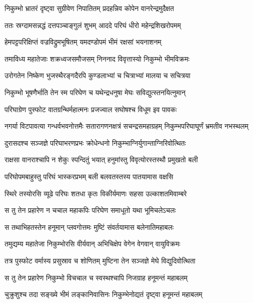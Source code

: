 
\twolineshloka
{निकुम्भो भ्रातरं दृष्ट्वा सुग्रीवेण निपातितम्}
{प्रदहन्निव कोपेन वानरेन्द्रमुदैक्षत} %

\twolineshloka
{ततः स्रग्दामसन्नद्धं दत्तपञ्चाङ्गुलं शुभम्}
{आददे परिघं धीरो महेन्द्रशिखरोपमम्} %

\twolineshloka
{हेमपट्टपरिक्षिप्तं वज्रविद्रुमभूषितम्}
{यमदण्डोपमं भीमं रक्षसां भयनाशनम्} %

\twolineshloka
{तमाविध्य महातेजाः शक्रध्वजसमौजसम्}
{निननाद विवृत्तास्यो निकुम्भो भीमविक्रमः} %

\twolineshloka
{उरोगतेन निष्केण भुजस्थैरङ्गदैरपि}
{कुण्डलाभ्यां च चित्राभ्यां मालया च सचित्रया} %

\twolineshloka
{निकुम्भो भूषणैर्भाति तेन स्म परिघेण च}
{यथेन्द्रधनुषा मेघः सविद्युत्स्तनयित्नुमान्} %

\twolineshloka
{परिघाग्रेण पुस्फोट वातग्रन्थिर्महात्मनः}
{प्रजज्वाल सघोषश्च विधूम इव पावकः} %

\threelineshloka
{नगर्या विटपावत्या गन्धर्वभवनोत्तमैः}
{सतारागणनक्षत्रं सचन्द्रसमहाग्रहम्}
{निकुम्भपरिघाघूर्णं भ्रमतीव नभस्थलम्} %

\twolineshloka
{दुरासदश्च सञ्जज्ञे परिघाभरणप्रभः}
{क्रोधेन्धनो निकुम्भाग्निर्युगान्ताग्निरिवोत्थितः} %

\twolineshloka
{राक्षसा वानराश्चापि न शेकुः स्पन्दितुं भयात्}
{हनुमांस्तु विवृत्योरस्तस्थौ प्रमुखतो बली} %

\twolineshloka
{परिघोपमबाहुस्तु परिघं भास्करप्रभम्}
{बली बलवतस्तस्य पातयामास वक्षसि} %

\twolineshloka
{स्थिरे तस्योरसि व्यूढे परिघः शतधा कृतः}
{विकीर्यमाणः सहसा उल्काशतमिवाम्बरे} %

\twolineshloka
{स तु तेन प्रहारेण न चचाल महाकपिः}
{परिघेण समाधूतो यथा भूमिचलेऽचलः} %

\twolineshloka
{स तथाभिहतस्तेन हनूमान् प्लवगोत्तमः}
{मुष्टिं संवर्तयामास बलेनातिमहाबलः} %

\twolineshloka
{तमुद्यम्य महातेजा निकुम्भोरसि वीर्यवान्}
{अभिचिक्षेप वेगेन वेगवान् वायुविक्रमः} %

\twolineshloka
{तत्र पुस्फोट वर्मास्य प्रसुस्राव च शोणितम्}
{मुष्टिना तेन सञ्जज्ञे मेघे विद्युदिवोत्थिता} %

\twolineshloka
{स तु तेन प्रहारेण निकुम्भो विचचाल च}
{स्वस्थश्चापि निजग्राह हनूमन्तं महाबलम्} %

\twolineshloka
{चुक्रुशुश्च तदा सङ्ख्ये भीमं लङ्कानिवासिनः}
{निकुम्भेनोद्यतं दृष्ट्वा हनूमन्तं महाबलम्} %

